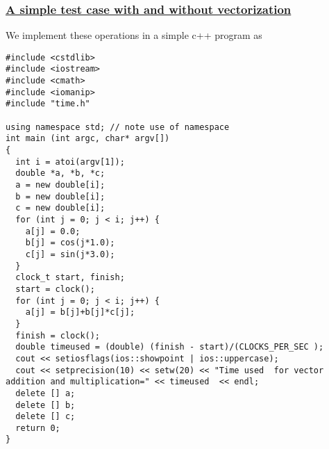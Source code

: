 \documentclass{beamer}
\begin{document}
\begin{frame}
\frametitle{\href{{https://github.com/CompPhysics/ComputationalPhysicsMSU/blob/master/doc/Programs/LecturePrograms/programs/Classes/cpp/program7.cpp}}{A simple test case with and without vectorization}}

We implement these operations in a simple c++ program as 

\begin{Verbatim}[numbers=none,fontsize=\fontsize{9pt}{9pt},baselinestretch=0.95]
#include <cstdlib>
#include <iostream>
#include <cmath>
#include <iomanip>
#include "time.h" 

using namespace std; // note use of namespace                                       
int main (int argc, char* argv[])
{
  int i = atoi(argv[1]); 
  double *a, *b, *c;
  a = new double[i]; 
  b = new double[i]; 
  c = new double[i]; 
  for (int j = 0; j < i; j++) {
    a[j] = 0.0;
    b[j] = cos(j*1.0);
    c[j] = sin(j*3.0);
  }
  clock_t start, finish;
  start = clock();
  for (int j = 0; j < i; j++) {
    a[j] = b[j]+b[j]*c[j];
  }
  finish = clock();
  double timeused = (double) (finish - start)/(CLOCKS_PER_SEC );
  cout << setiosflags(ios::showpoint | ios::uppercase);
  cout << setprecision(10) << setw(20) << "Time used  for vector addition and multiplication=" << timeused  << endl;
  delete [] a;
  delete [] b;
  delete [] c;
  return 0;     
}
\end{Verbatim}
\end{frame}
\end{document}
